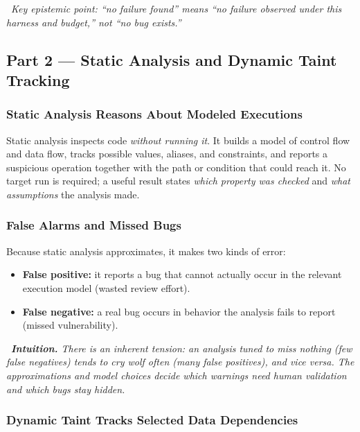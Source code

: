 \documentclass[hidelinks]{article}
\newcommand{\callout}[1]{\par\smallskip\noindent{\color{capri}$\blacktriangleright$}\ \textit{#1}\par\smallskip}
\begin{document}
\callout{Key epistemic point: ``no failure found'' means ``no failure \emph{observed under this harness and budget},'' not ``no bug exists.''}

\subsection{Part 2 --- Static Analysis and Dynamic Taint Tracking}

\subsubsection{Static Analysis Reasons About Modeled Executions}

Static analysis inspects code \emph{without running it}. It builds a model of control flow and data flow, tracks possible values, aliases, and constraints, and reports a suspicious operation together with the path or condition that could reach it. No target run is required; a useful result states \emph{which property was checked} and \emph{what assumptions} the analysis made.

\subsubsection{False Alarms and Missed Bugs}

Because static analysis approximates, it makes two kinds of error:
\begin{itemize}
    \item \textbf{False positive:} it reports a bug that cannot actually occur in the relevant execution model (wasted review effort).
    \item \textbf{False negative:} a real bug occurs in behavior the analysis fails to report (missed vulnerability).
\end{itemize}

\callout{\textbf{Intuition.} There is an inherent tension: an analysis tuned to miss nothing (few false negatives) tends to cry wolf often (many false positives), and vice versa. The approximations and model choices decide which warnings need human validation and which bugs stay hidden.}

\subsubsection{Dynamic Taint Tracks Selected Data Dependencies}
\end{document}
